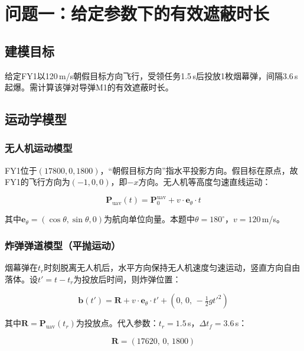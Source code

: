 \documentclass[a4paper]{ctexart}
\newcommand{\bm}[1]{\boldsymbol{#1}}
\begin{document}
\section{问题一：给定参数下的有效遮蔽时长}

\subsection{建模目标}

给定FY1以120\,m/s朝假目标方向飞行，受领任务1.5\,s后投放1枚烟幕弹，间隔3.6\,s起爆。需计算该弹对导弹M1的有效遮蔽时长。

\subsection{运动学模型}

\subsubsection{无人机运动模型}

FY1位于$(17800, 0, 1800)$，``朝假目标方向''指水平投影方向。假目标在原点，故FY1的飞行方向为$(-1, 0, 0)$，即$-x$方向。无人机等高度匀速直线运动：

\begin{equation}
\bm{P}_{\text{uav}}(t) = \bm{P}_0^{\text{uav}} + v \cdot \bm{e}_\theta \cdot t
\label{eq:uav}
\end{equation}

其中$\bm{e}_\theta = (\cos\theta, \sin\theta, 0)$为航向单位向量。本题中$\theta = 180^\circ$，$v = 120$\,m/s。

\subsubsection{炸弹弹道模型（平抛运动）}

烟幕弹在$t_r$时刻脱离无人机后，水平方向保持无人机速度匀速运动，竖直方向自由落体。设$t' = t - t_r$为投放后时间，则炸弹位置：

\begin{equation}
\bm{b}(t') = \bm{R} + v \cdot \bm{e}_\theta \cdot t' + \left(0,\, 0,\, -\tfrac{1}{2}g{t'}^2\right)
\label{eq:bomb}
\end{equation}

其中$\bm{R} = \bm{P}_{\text{uav}}(t_r)$为投放点。代入参数：$t_r = 1.5$\,s，$\Delta t_f = 3.6$\,s：

\begin{equation}
\bm{R} = (17620,\, 0,\, 1800)
\label{eq:release}
\end{equation}
\end{document}
